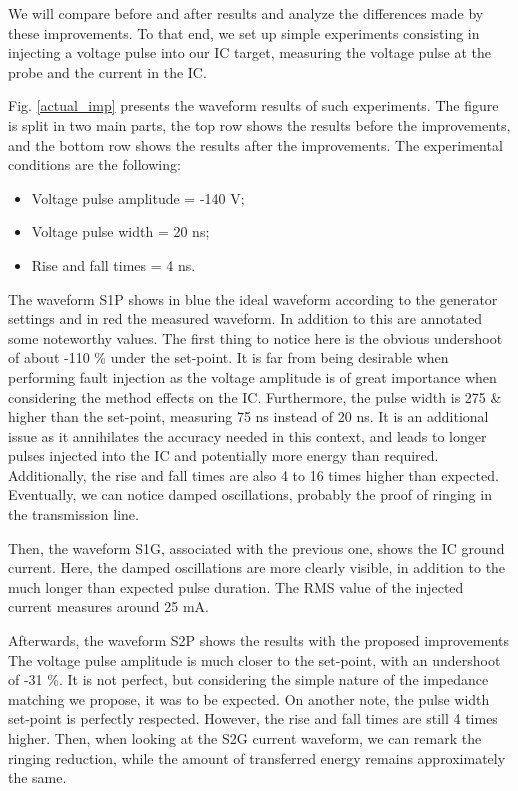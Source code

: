 		We will compare before and after results and analyze the differences made by these improvements.
		To that end, we set up simple experiments consisting in injecting a voltage pulse into our IC target, measuring the voltage pulse at the probe and the current in the IC.
		
		Fig. \ref{actual_imp} presents the waveform results of such experiments.
		The figure is split in two main parts, the top row shows the results before the improvements, and the bottom row shows the results after the improvements.
		The experimental conditions are the following:
		\begin{itemize}
			\item Voltage pulse amplitude = -140 V;
			\item Voltage pulse width = 20 ns;
			\item Rise and fall times = 4 ns.
		\end{itemize}

		The waveform S1P shows in blue the ideal waveform according to the generator settings and in red the measured waveform.
		In addition to this are annotated some noteworthy values.
		The first thing to notice here is the obvious undershoot of about -110 \% under the set-point.
		It is far from being desirable when performing fault injection as the voltage amplitude is of great importance when considering the method effects on the IC.
		Furthermore, the pulse width is 275 \& higher than the set-point, measuring 75 ns instead of 20 ns.
		It is an additional issue as it annihilates the accuracy needed in this context, and leads to longer pulses injected into the IC and potentially more energy than required.
		Additionally, the rise and fall times are also 4 to 16 times higher than expected.
		Eventually, we can notice damped oscillations, probably the proof of ringing in the transmission line.

		Then, the waveform S1G, associated with the previous one, shows the IC ground current.
		Here, the damped oscillations are more clearly visible, in addition to the much longer than expected pulse duration.
		The RMS value of the injected current measures around 25 mA.

		Afterwards, the waveform S2P shows the results with the proposed improvements
		The voltage pulse amplitude is much closer to the set-point, with an undershoot of -31 \%.
		It is not perfect, but considering the simple nature of the impedance matching we propose, it was to be expected.
		On another note, the pulse width set-point is perfectly respected.
		However, the rise and fall times are still 4 times higher.
		Then, when looking at the S2G current waveform, we can remark the ringing reduction, while the amount of transferred energy remains approximately the same.

